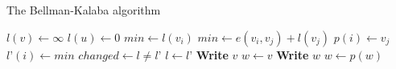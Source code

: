 \documentclass{article}
\begin{document}
\begin{algorithm}
  \caption{The Bellman-Kalaba algorithm}
  \begin{algorithmic}[1]
    \State $l(v) \leftarrow \infty$
    \EndFor
    \State $l(u) \leftarrow 0$
    \Repeat
    \State $min \leftarrow l(v_i)$
    \State $min \leftarrow e(v_i, v_j) + l(v_j)$
    \State $p(i) \leftarrow v_j$
    \EndIf
    \EndFor
    \State $l’(i) \leftarrow min$
    \EndFor
    \State $changed \leftarrow l \not= l’$
    \State $l \leftarrow l’$
    \EndProcedure
    \Statex
    \State \textbf{Write} $v$
    \Else
    \State $w \leftarrow v$
    \State \textbf{Write} $w$
    \State $w \leftarrow p(w)$
    \EndWhile
    \EndIf
    \EndProcedure
  \end{algorithmic}

\end{algorithm}
\end{document}
